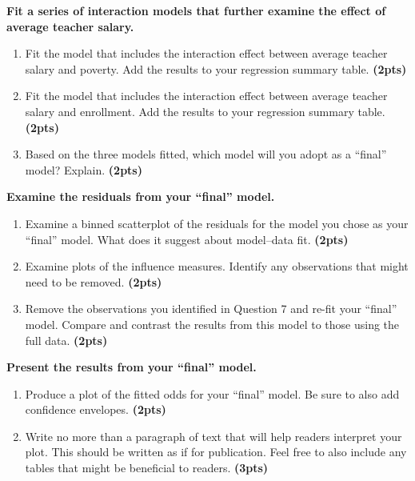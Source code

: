 \documentclass[]{article}
\begin{document}
\pagebreak

\noindent\textbf{Fit a series of interaction models that further examine the effect of average teacher salary.}

\begin{enumerate}[resume]
\item Fit the model that includes the interaction effect between average teacher salary and poverty. Add the results to your regression summary table. \textbf{(2pts)}
\item Fit the model that includes the interaction effect between average teacher salary and enrollment. Add the results to your regression summary table. \textbf{(2pts)}
\item Based on the three models fitted, which model will you adopt as a ``final'' model? Explain. \textbf{(2pts)} 
\end{enumerate}

\vspace{\baselineskip}
 \noindent\textbf{Examine the residuals from your ``final'' model.}

\begin{enumerate}[resume]
\item Examine a binned scatterplot of the residuals for the model you chose as your ``final'' model. What does it suggest about model--data fit. \textbf{(2pts)}
\item Examine plots of the influence measures. Identify any observations that might need to be removed. \textbf{(2pts)}
\item Remove the observations you identified in Question 7 and re-fit your ``final'' model. Compare and contrast the results from this model to those using the full data. \textbf{(2pts)}
\end{enumerate}

\vspace{\baselineskip}
\noindent\textbf{Present the results from your ``final'' model.}

\begin{enumerate}[resume]
\item Produce a plot of the fitted odds for your ``final'' model. Be sure to also add confidence envelopes. \textbf{(2pts)}
\item Write no more than a paragraph of text that will help readers interpret your plot. This should be written as if for publication. Feel free to also include any tables that might be beneficial to readers. \textbf{(3pts)}
\end{enumerate}
\end{document}
